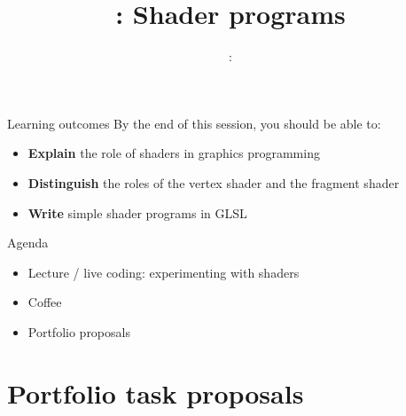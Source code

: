 \usepackage{../../beamerthemeFalmouthGamesAcademy}
\usepackage{multimedia}
\graphicspath{ {../../} }




\usepackage[normalem]{ulem}
\usepackage{wasysym}

\usepackage{pdfpages}

\usetikzlibrary{arrows,automata}




\title{\sessionnumber: Shader programs}
\subtitle{\modulecode: \moduletitle}

\frame{\titlepage} 

\begin{frame}{Learning outcomes}
	By the end of this session, you should be able to:
	\begin{itemize}
		\item \textbf{Explain} the role of shaders in graphics programming
		\item \textbf{Distinguish} the roles of the vertex shader and the fragment shader
		\item \textbf{Write} simple shader programs in GLSL
	\end{itemize}
\end{frame}

\begin{frame}{Agenda}
	\begin{itemize}
		\item Lecture / live coding: experimenting with shaders
		\item Coffee
		\item Portfolio proposals
	\end{itemize}
\end{frame}





\part{Portfolio task proposals}
\frame{\partpage}


